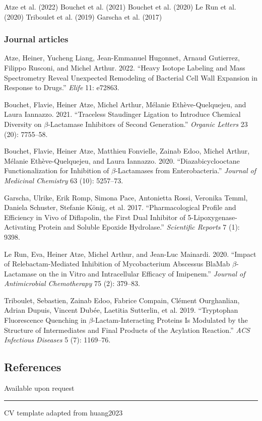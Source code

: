 \documentclass[
  letterpaper,
  DIV=11,
  numbers=noendperiod]{scrartcl}
\newlength{\cslhangindent}
\newenvironment{CSLReferences}[2] %
 {\begin{list}{}{%
  \setlength{\itemindent}{0pt}
  \setlength{\leftmargin}{0pt}
  \setlength{\parsep}{0pt}
  \ifodd #1
   \setlength{\leftmargin}{\cslhangindent}
   \setlength{\itemindent}{-1\cslhangindent}
  \fi
  \setlength{\itemsep}{#2\baselineskip}}}
 {\end{list}}
\begin{document}
Atze et al. (2022) Bouchet et al. (2021) Bouchet et al. (2020) Le Run et
al. (2020) Triboulet et al. (2019) Garscha et al. (2017)

\subsubsection{Journal articles}\label{journal-articles}

\label{refs}
\begin{CSLReferences}{1}{0}
Atze, Heiner, Yucheng Liang, Jean-Emmanuel Hugonnet, Arnaud Gutierrez,
Filippo Rusconi, and Michel Arthur. 2022. {``Heavy Isotope Labeling and
Mass Spectrometry Reveal Unexpected Remodeling of Bacterial Cell Wall
Expansion in Response to Drugs.''} \emph{Elife} 11: e72863.

Bouchet, Flavie, Heiner Atze, Michel Arthur, Mélanie Ethève-Quelquejeu,
and Laura Iannazzo. 2021. {``Traceless Staudinger Ligation to Introduce
Chemical Diversity on \(\beta\)-Lactamase Inhibitors of Second
Generation.''} \emph{Organic Letters} 23 (20): 7755--58.

Bouchet, Flavie, Heiner Atze, Matthieu Fonvielle, Zainab Edoo, Michel
Arthur, Mélanie Ethève-Quelquejeu, and Laura Iannazzo. 2020.
{``Diazabicyclooctane Functionalization for Inhibition of
\(\beta\)-Lactamases from Enterobacteria.''} \emph{Journal of Medicinal
Chemistry} 63 (10): 5257--73.

Garscha, Ulrike, Erik Romp, Simona Pace, Antonietta Rossi, Veronika
Temml, Daniela Schuster, Stefanie König, et al. 2017. {``Pharmacological
Profile and Efficiency in Vivo of Diflapolin, the First Dual Inhibitor
of 5-Lipoxygenase-Activating Protein and Soluble Epoxide Hydrolase.''}
\emph{Scientific Reports} 7 (1): 9398.

Le Run, Eva, Heiner Atze, Michel Arthur, and Jean-Luc Mainardi. 2020.
{``Impact of Relebactam-Mediated Inhibition of Mycobacterium Abscessus
BlaMab \(\beta\)-Lactamase on the in Vitro and Intracellular Efficacy of
Imipenem.''} \emph{Journal of Antimicrobial Chemotherapy} 75 (2):
379--83.

Triboulet, Sebastien, Zainab Edoo, Fabrice Compain, Clément Ourghanlian,
Adrian Dupuis, Vincent Dubée, Laetitia Sutterlin, et al. 2019.
{``Tryptophan Fluorescence Quenching in \(\beta\)-Lactam-Interacting
Proteins Is Modulated by the Structure of Intermediates and Final
Products of the Acylation Reaction.''} \emph{ACS Infectious Diseases} 5
(7): 1169--76.

\end{CSLReferences}

\subsection{References}\label{references}

Available upon request

\begin{center}\rule{0.5\linewidth}{0.5pt}\end{center}

CV template adapted from huang2023
\end{document}
